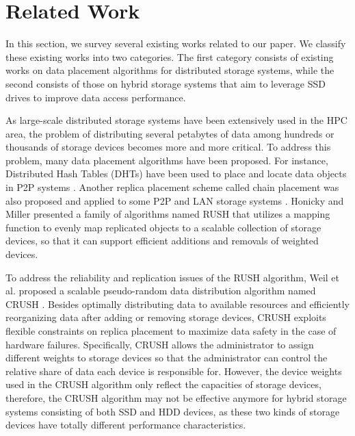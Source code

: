 \section{Related Work}
\label{sec:relatedwork}

In this section, we survey several existing works related to our paper. We classify these existing works into two categories. The first category consists of existing works on data placement algorithms for distributed storage systems, while the second consists of those on hybrid storage systems that aim to leverage SSD drives to improve data access performance.

As large-scale distributed storage systems have been extensively used in the HPC area, the problem of distributing several petabytes of data among hundreds or thousands of storage devices becomes more and more critical. To address this problem, many data placement algorithms have been proposed. For instance, Distributed Hash Tables (DHTs) have been used to place and locate data objects in P2P systems \cite{Stoica2001, Ratnasamy2001, Cai2004}. Another replica placement scheme called chain placement was also proposed and applied to some P2P and LAN storage systems \cite{Rowstron2001, Lee1996, MacCormick2004}. Honicky and Miller presented a family of algorithms named RUSH \cite{honicky04} that utilizes a mapping function to evenly map replicated
objects to a scalable collection of storage devices, so that it can support efficient additions and removals of weighted devices.

To address the reliability and replication issues of the RUSH algorithm, Weil et al. proposed a scalable pseudo-random data distribution algorithm named CRUSH \cite{Weil2006}. Besides optimally distributing data to available resources and efficiently reorganizing data after adding or removing storage devices, CRUSH exploits flexible constraints on replica placement to maximize data safety in the case of hardware failures. Specifically, CRUSH allows the administrator to assign different weights to storage devices so that the administrator can control the relative share of data each device is responsible for. However, the device weights used in the CRUSH algorithm only reflect the capacities of storage devices, therefore, the CRUSH algorithm may not be effective anymore for hybrid storage systems consisting of both SSD and HDD devices, as these two kinds of storage devices have totally different performance characteristics.

